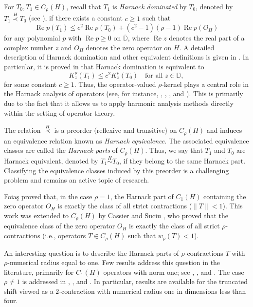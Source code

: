 \documentclass[12pt, reqno]{amsart}
\theoremstyle{definition}
\theoremstyle{remark}
\numberwithin{equation}{section}
\begin{document}
For $T_0, T_1 \in C_\rho(H)$, recall that $T_1$ is \emph{Harnack dominated} by $T_0$, denoted by $T_{1} \stackrel{H}{\prec} T_{0}$ (see \cite{CaSu}), if there exists a constant $c \geq 1$ such that
\begin{equation*}
	\operatorname{Re} p(T_1) \leq c^{2} \operatorname{Re} p(T_0) + (c^{2}-1)(\rho - 1)\operatorname{Re} p(O_{H})
\end{equation*}
for any polynomial $p$ with $\operatorname{Re} p \geq 0$ on $\overline{\mathbb{D}}$, where $\operatorname{Re} z$ denotes the real part of a complex number $z$ and $O_H$ denotes the zero operator on $H$. A detailed description of Harnack domination and other equivalent definitions is given in \cite[Theorem 3.1]{CaSu}. In particular, it is proved in \cite{CaSu} that Harnack domination is equivalent to
\begin{equation}\label{harnack}
	K_{z}^{\rho}(T_{1}) \leq c^{2} K_{z}^{\rho}(T_{0}) \quad \text{for all } z \in \mathbb{D},
\end{equation}
for some constant $c \geq 1$. Thus, the operator-valued $\rho$-kernel plays a central role in the Harnack analysis of operators (see, for instance, \cite{Cassier_2}, \cite{CaSu}, \cite{CaBeBel2018}, and \cite{CassierBenharrat2020}). This is primarily due to the fact that it allows us to apply harmonic analysis methods directly within the setting of operator theory.

The relation $\stackrel{H}{\prec}$ is a preorder (reflexive and transitive) on $C_\rho(H)$ and induces an equivalence relation known as \emph{Harnack equivalence}. The associated equivalence classes are called the \emph{Harnack parts} of $C_\rho(H)$. Thus, we say that $T_{1}$ and $T_{0}$ are Harnack equivalent, denoted by $T_{1} \stackrel{H}{\sim} T_{0}$, if they belong to the same Harnack part. Classifying the equivalence classes induced by this preorder is a challenging problem and remains an active topic of research.

Foia\c{s} \cite{Foias} proved that, in the case $\rho=1$, the Harnack part of $C_1(H)$ containing the zero operator $O_H$ is exactly the class of all strict contractions ($\|T\| < 1$). This work was extended to $C_\rho(H)$ by Cassier and Suciu \cite[Theorem 4.4]{CaSu}, who proved that the equivalence class of the zero operator $O_H$ is exactly the class of all strict $\rho$-contractions (i.e., operators $T \in C_\rho(H)$ such that $w_{\rho}(T) < 1$).

An interesting question is to describe the Harnack parts of $\rho$-contractions $T$ with $\rho$-numerical radius equal to one. Few results address this question in the literature, primarily for $C_1(H)$ operators with norm one; see \cite{AnSuTi}, \cite{KSS}, and \cite{BaTiSu}. The case $\rho \neq 1$ is addressed in \cite{CaBeBel2018}, \cite{CassierBenharrat2020}, and \cite{CaNaBe2024}. In particular, results are available for the truncated shift viewed as a $2$-contraction with numerical radius one in dimensions less than four.
\end{document}
